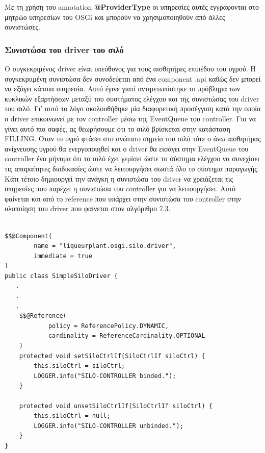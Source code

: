 Με τη χρήση του annotation \textbf{@ProviderType} οι υπηρεσίες αυτές εγγράφονται στο μητρώο υπηρεσίων του OSGi και μπορούν να χρησιμοποιηθούν από άλλες συνιστώσες.


\subsubsection{Συνιστώσα του driver του σιλό}
Ο συγκεκριμένος driver είναι υπεύθυνος για τους αισθητήρες επιπέδου του υγρού. Η συγκεκριιμένη συνιστώσα δεν συνοδεύεται από ένα component .api καθώς δεν μπορεί να εξάγει κάποια υπηρεσία. Αυτό έγινε γιατί αντιμετωπίστηκε το πρόβλημα των κυκλικών εξαρτήσεων μεταξύ του συστήματος ελέγχου και της συνιστώσας του driver του σιλό. Γι’ αυτό το λόγο ακολουθήθηκε μία διαφορετική προσέγγιση κατά την οποία ο driver επικοινωνεί με τον controller μέσω της EventQueue του controller. Για να γίνει αυτό πιο σαφές, ας θεωρήσουμε ότι το σιλό βρίσκεται στην κατάσταση FILLING. Όταν το υγρό φτάσει στο ανώτατο σημείο του σιλό τότε ο άνω αισθητήρας ανίχνευσης υγρού θα ενεργοποιηθεί και ο driver θα εισάγει στην EventQueue του controller ένα μήνυμα ότι το σιλό έχει γεμίσει ώστε το σύστημα ελέγχου να συνεχίσει τις απαραίτητες διαδικασίες ώστε να λειτουργήσει σωστά όλο το σύστημα παραγωγής. Κάτι τέτοιο δημιουργεί την ανάγκη η συνιστώσα του driver να χρειάζεται τις υπηρεσίες που παρέχει η συνιστώσα του controller για να λειτουργήσει. Αυτό φαίνεται και από το reference που υπάρχει στην συνιστώσα του controller στην υλοποίηση του driver που φαίνεται στον αλγόριθμο 7.3. 
\begin{lstlisting}[caption=Μέρος της υλοποίησης της συνιστώσας του driver του σιλό]

$$@Component(
        name = "liqueurplant.osgi.silo.driver",
        immediate = true
)
public class SimpleSiloDriver {
   .
   .
   .
    $$@Reference(
            policy = ReferencePolicy.DYNAMIC,
            cardinality = ReferenceCardinality.OPTIONAL
    )
    protected void setSiloCtrlIf(SiloCtrlIf siloCtrl) {
        this.siloCtrl = siloCtrl;
        LOGGER.info("SILO-CONTROLLER binded.");
    }

    protected void unsetSiloCtrlIf(SiloCtrlIf siloCtrl) {
        this.siloCtrl = null;
        LOGGER.info("SILO-CONTROLLER unbinded.");
    }
}
\end{lstlisting}

